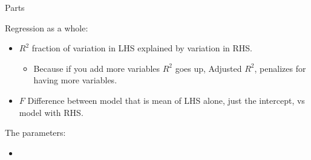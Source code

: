 \documentclass[
  ignorenonframetext,
]{beamer}
\providecommand{\tightlist}{%
  \setlength{\itemsep}{0pt}\setlength{\parskip}{0pt}}
\begin{document}
\begin{frame}{Parts}
\protect\hypertarget{parts}{}

Regression as a whole:

\begin{itemize}
\tightlist
\item
  \(R^2\) fraction of variation in LHS explained by variation in RHS.

  \begin{itemize}
  \tightlist
  \item
    Because if you add more variables \(R^2\) goes up, Adjusted \(R^2\),
    penalizes for having more variables.
  \end{itemize}
\item
  \(F\) Difference between model that is mean of LHS alone, just the
  intercept, vs model with RHS.
\end{itemize}

The parameters:

\begin{itemize}
\item
\end{itemize}

\end{frame}
\end{document}
